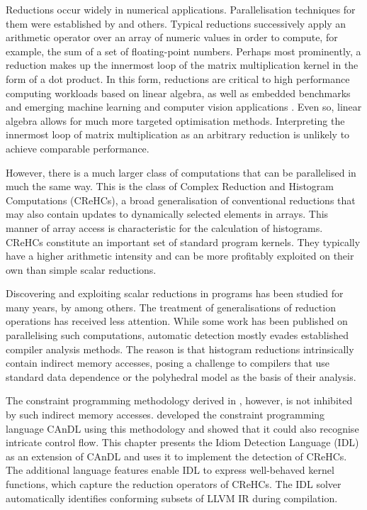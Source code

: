     Reductions occur widely in numerical applications.
    Parallelisation techniques for them were established by
    \citet{rauchwerger1999lrpd,yu2006adaptive,Jradi2017fast} and others.
    Typical reductions successively apply an arithmetic operator over an
    array of numeric values in order to compute, for example, the sum of a set
    of floating-point numbers.
    Perhaps most prominently, a reduction makes up the innermost loop of the
    matrix multiplication kernel in the form of a dot product.
    In this form, reductions are critical to high performance computing
    workloads based on linear algebra, as well as embedded benchmarks and
    emerging machine learning and computer vision applications
    \citep{Reddy2016Reduction}.
    Even so, linear algebra allows for much more targeted optimisation methods.
    Interpreting the innermost loop of matrix multiplication as an arbitrary
    reduction is unlikely to achieve comparable performance.

    However, there is a much larger class of computations that can be
    parallelised in much the same way.
    This is the class of Complex Reduction and Histogram Computations (CReHCs),
    a broad generalisation of conventional reductions that may also contain
    updates to dynamically selected elements in arrays.
    This manner of array access is characteristic for the calculation of
    histograms.
    CReHCs constitute an important set of standard program kernels.
    They typically have a higher arithmetic intensity and can be more profitably
    exploited on their own than simple scalar reductions.

    Discovering and exploiting scalar reductions in programs has been
    studied for many years, by \citet{pottenger1995idiom} among others.
    The treatment of generalisations of reduction operations has received less
    attention.
    While some work has been published on parallelising such computations,
    automatic detection mostly evades established compiler analysis methods.
    The reason is that histogram reductions intrinsically contain indirect
    memory accesses, posing a challenge to compilers that use
    standard data dependence \citep{kuck1981dependence} or the polyhedral model
    \citep{benabderrahmane2010polyhedral} as the basis of their analysis.

    The constraint programming methodology derived in ,
    however, is not inhibited by such indirect memory accesses.
     developed the constraint programming language CAnDL
    using this methodology and showed that it could also recognise intricate
    control flow.
    This chapter presents the Idiom Detection Language (IDL) as an extension
    of CAnDL and uses it to implement the detection of CReHCs.
    The additional language features enable IDL to express well-behaved
    kernel functions, which capture the reduction operators of CReHCs.
    The IDL solver automatically identifies conforming subsets of LLVM IR during
    compilation.

